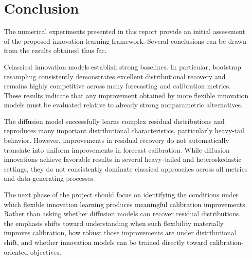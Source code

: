 \documentclass[11pt]{article}
\begin{document}
\section{Conclusion}

The numerical experiments presented in this report provide an initial assessment of the proposed innovation-learning framework. Several conclusions can be drawn from the results obtained thus far.

Cclassical innovation models establish strong baselines. In particular, bootstrap resampling consistently demonstrates excellent distributional recovery and remains highly competitive across many forecasting and calibration metrics. These results indicate that any improvement obtained by more flexible innovation models must be evaluated relative to already strong nonparametric alternatives.

The diffusion model successfully learns complex residual distributions and reproduces many important distributional characteristics, particularly heavy-tail behavior. However, improvements in residual recovery do not automatically translate into uniform improvements in forecast calibration. While diffusion innovations achieve favorable results in several heavy-tailed and heteroskedastic settings, they do not consistently dominate classical approaches across all metrics and data-generating processes.

The next phase of the project should focus on identifying the conditions under which flexible innovation learning produces meaningful calibration improvements. Rather than asking whether diffusion models can recover residual distributions, the emphasis shifts toward understanding when such flexibility materially improves calibration, how robust those improvements are under distributional shift, and whether innovation models can be trained directly toward calibration-oriented objectives.
\end{document}
